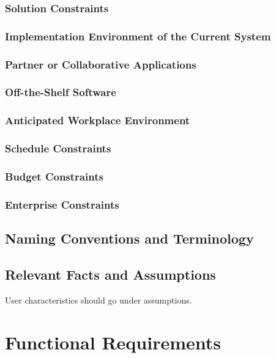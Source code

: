 \documentclass[12pt, titlepage]{article}
\begin{document}
\subsubsection{Solution Constraints}

\subsubsection{Implementation Environment of the Current System}

\subsubsection{Partner or Collaborative Applications}

\subsubsection{Off-the-Shelf Software}

\subsubsection{Anticipated Workplace Environment}

\subsubsection{Schedule Constraints}

\subsubsection{Budget Constraints}

\subsubsection{Enterprise Constraints}

\subsection{Naming Conventions and Terminology}

\subsection{Relevant Facts and Assumptions}

User characteristics should go under assumptions.

\section{Functional Requirements}
\end{document}
